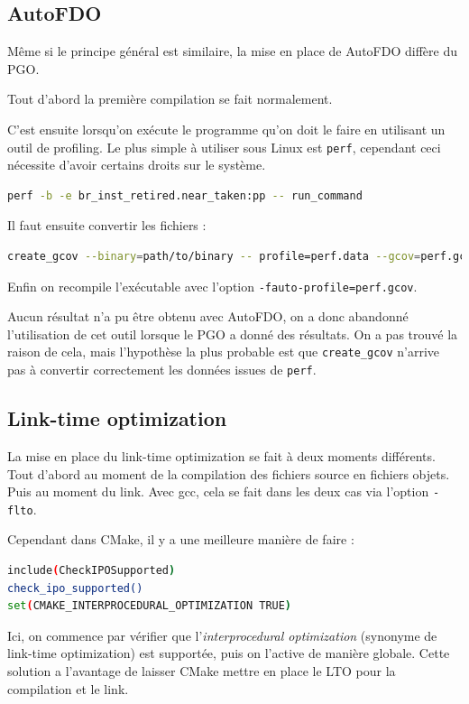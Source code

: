 \documentclass[a4paper]{report}
\begin{document}
\subsection{AutoFDO}
Même si le principe général est similaire, la mise en place de AutoFDO diffère du PGO.

Tout d'abord la première compilation se fait normalement.

C'est ensuite lorsqu'on exécute le programme qu'on doit le faire en utilisant un outil de profiling.
Le plus simple à utiliser sous Linux est \verb'perf', cependant ceci nécessite d'avoir certains droits sur le système.
\begin{lstlisting}[language=bash]
perf -b -e br_inst_retired.near_taken:pp -- run_command
\end{lstlisting}
Il faut ensuite convertir les fichiers :
\begin{lstlisting}[language=bash]
create_gcov --binary=path/to/binary -- profile=perf.data --gcov=perf.gcov -gcov_version=1
\end{lstlisting}

Enfin on recompile l'exécutable avec l'option \verb'-fauto-profile=perf.gcov'.

Aucun résultat n'a pu être obtenu avec AutoFDO, on a donc abandonné l'utilisation de cet outil lorsque le PGO a donné des résultats.
On a pas trouvé la raison de cela, mais l'hypothèse la plus probable est que \verb'create_gcov' n'arrive pas à convertir correctement les données issues de \verb'perf'.

\subsection{Link-time optimization}
La mise en place du link-time optimization se fait à deux moments différents.
Tout d'abord au moment de la compilation des fichiers source en fichiers objets.
Puis au moment du link.
Avec gcc, cela se fait dans les deux cas via l'option \verb'-flto'.

Cependant dans CMake, il y a une meilleure manière de faire :
\begin{lstlisting}[language=bash]
include(CheckIPOSupported)
check_ipo_supported()
set(CMAKE_INTERPROCEDURAL_OPTIMIZATION TRUE)
\end{lstlisting}
Ici, on commence par vérifier que l'\emph{interprocedural optimization} (synonyme de link-time optimization) est supportée, puis on l'active de manière globale.
Cette solution a l'avantage de laisser CMake mettre en place le LTO pour la compilation et le link.
\end{document}
